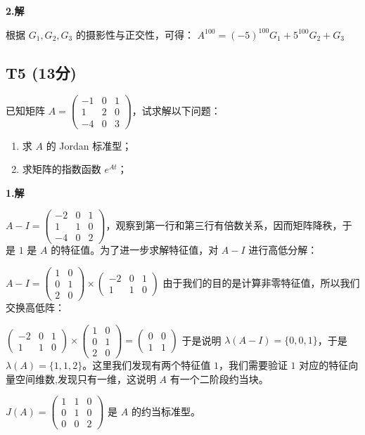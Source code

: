 \documentclass{article}
\begin{document}
\par \textbf{2.解}

根据 $G_1, G_2, G_3$ 的摄影性与正交性，可得： $A^{100}=(-5)^{100}G_1+5^{100}G_2 + G_3$

\subsection{T5 (13分)}

\par 已知矩阵 $A=\begin{pmatrix}
	-1 & 0 & 1\\
	1 & 2 & 0\\
	-4 & 0 & 3
\end{pmatrix}$，试求解以下问题：

\begin{enumerate}
	\item 求 $A$ 的 Jordan 标准型；
	\item 求矩阵的指数函数 $e^{At}$；
\end{enumerate}

\par \textbf{1.解}

$A-I=\begin{pmatrix}
	-2 & 0 & 1\\
	1 & 1 & 0\\
	-4 & 0 & 2
\end{pmatrix}$，观察到第一行和第三行有倍数关系，因而矩阵降秩，于是 $1$ 是 $A$ 的特征值。为了进一步求解特征值，对 $A-I$ 进行高低分解：

$A-I=\begin{pmatrix}
	1 & 0\\
	0 & 1\\
	2 & 0
\end{pmatrix}\times \begin{pmatrix}
	-2 & 0 & 1\\
	1 & 1 & 0
\end{pmatrix}$ 由于我们的目的是计算非零特征值，所以我们交换高低阵：

$\begin{pmatrix}
	-2 & 0 & 1\\
	1 & 1 & 0
\end{pmatrix} \times \begin{pmatrix}
1 & 0\\
0 & 1\\
2 & 0
\end{pmatrix}=\begin{pmatrix}
	0 & 0\\
	1 & 1
\end{pmatrix}$ 于是说明 $\lambda(A-I)=\{0, 0, 1\}$，于是 $\lambda(A)=\{1, 1, 2\}$。这里我们发现有两个特征值 $1$，我们需要验证 $1$ 对应的特征向量空间维数,发现只有一维，这说明 $A$ 有一个二阶段约当块。

$J(A)=\begin{pmatrix}
	1 & 1 & 0\\
	0 & 1 & 0\\
	0 & 0 & 2
\end{pmatrix}$ 是 $A$ 的约当标准型。
\end{document}
